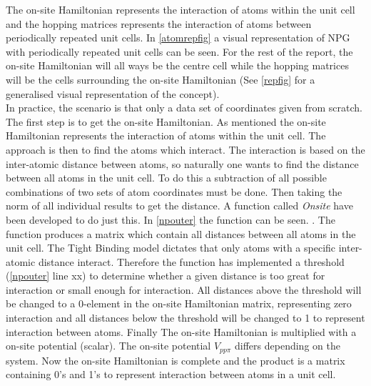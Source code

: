 The on-site Hamiltonian represents the interaction of atoms within the unit cell and the hopping matrices represents the interaction of atoms between periodically repeated unit cells.
In \cref{atomrepfig} a visual representation of NPG with periodically repeated unit cells can be seen. For the rest of the report, the on-site Hamiltonian will all ways be the centre cell while the hopping matrices will be the cells surrounding the on-site Hamiltonian (See \cref{repfig} for a generalised visual representation of the concept). \\
In practice, the scenario is that only a data set of coordinates given from scratch. The first step is to get the on-site Hamiltonian. As mentioned the on-site Hamiltonian represents the interaction of atoms within the unit cell. The approach is then to find the atoms which interact. The interaction is based on the inter-atomic distance between atoms, so naturally one wants to find the distance between all atoms in the unit cell. To do this a subtraction of all possible combinations of two sets of atom coordinates must be done. Then taking the norm of all individual results to get the distance. A function called \textit{Onsite} have been developed to do just this. In \cref{npouter} the function can be seen.
.
\vspace{-1\baselineskip}
\vspace{\baselineskip}
The function produces a matrix which contain all distances between all atoms in the unit cell. The Tight Binding model dictates that only atoms with a specific inter-atomic distance interact. Therefore the function has implemented a threshold (\cref{npouter} line xx) to determine whether a given distance is too great for interaction or small enough for interaction. All distances above the threshold will be changed to a 0-element in the on-site Hamiltonian matrix, representing zero interaction and all distances below the threshold will be changed to 1 to represent interaction between atoms. Finally The on-site Hamiltonian is multiplied with a on-site potential (scalar). The on-site potential \(V_{pp\pi}\) differs depending on the system. Now the on-site Hamiltonian is complete and the product is a matrix containing 0's and 1's to represent interaction between atoms in a unit cell. \\
